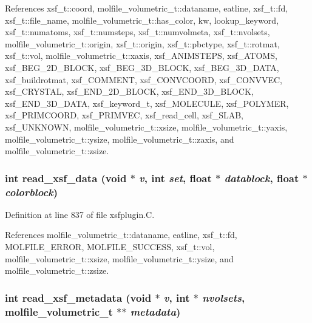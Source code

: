 References xsf\_\-t::coord, molfile\_\-volumetric\_\-t::dataname, eatline, xsf\_\-t::fd, xsf\_\-t::file\_\-name, molfile\_\-volumetric\_\-t::has\_\-color, kw, lookup\_\-keyword, xsf\_\-t::numatoms, xsf\_\-t::numsteps, xsf\_\-t::numvolmeta, xsf\_\-t::nvolsets, molfile\_\-volumetric\_\-t::origin, xsf\_\-t::origin, xsf\_\-t::pbctype, xsf\_\-t::rotmat, xsf\_\-t::vol, molfile\_\-volumetric\_\-t::xaxis, xsf\_\-ANIMSTEPS, xsf\_\-ATOMS, xsf\_\-BEG\_\-2D\_\-BLOCK, xsf\_\-BEG\_\-3D\_\-BLOCK, xsf\_\-BEG\_\-3D\_\-DATA, xsf\_\-buildrotmat, xsf\_\-COMMENT, xsf\_\-CONVCOORD, xsf\_\-CONVVEC, xsf\_\-CRYSTAL, xsf\_\-END\_\-2D\_\-BLOCK, xsf\_\-END\_\-3D\_\-BLOCK, xsf\_\-END\_\-3D\_\-DATA, xsf\_\-keyword\_\-t, xsf\_\-MOLECULE, xsf\_\-POLYMER, xsf\_\-PRIMCOORD, xsf\_\-PRIMVEC, xsf\_\-read\_\-cell, xsf\_\-SLAB, xsf\_\-UNKNOWN, molfile\_\-volumetric\_\-t::xsize, molfile\_\-volumetric\_\-t::yaxis, molfile\_\-volumetric\_\-t::ysize, molfile\_\-volumetric\_\-t::zaxis, and molfile\_\-volumetric\_\-t::zsize.
\subsubsection{\setlength{\rightskip}{0pt plus 5cm}int read\_\-xsf\_\-data (void $\ast$ {\em v}, int {\em set}, float $\ast$ {\em datablock}, float $\ast$ {\em colorblock})\hspace{0.3cm}{\tt  [static]}}\label{xsfplugin_8C_a43}




Definition at line 837 of file xsfplugin.C.

References molfile\_\-volumetric\_\-t::dataname, eatline, xsf\_\-t::fd, MOLFILE\_\-ERROR, MOLFILE\_\-SUCCESS, xsf\_\-t::vol, molfile\_\-volumetric\_\-t::xsize, molfile\_\-volumetric\_\-t::ysize, and molfile\_\-volumetric\_\-t::zsize.
\subsubsection{\setlength{\rightskip}{0pt plus 5cm}int read\_\-xsf\_\-metadata (void $\ast$ {\em v}, int $\ast$ {\em nvolsets}, {\bf molfile\_\-volumetric\_\-t} $\ast$$\ast$ {\em metadata})\hspace{0.3cm}{\tt  [static]}}\label{xsfplugin_8C_a42}




